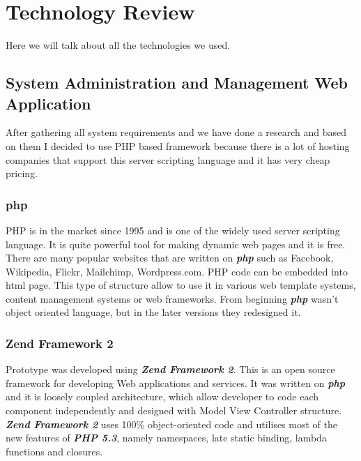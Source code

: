 \chapter{Technology Review} %
Here we will talk about all the technologies we used.

  \section{System Administration and Management Web Application}	%
  After gathering all system requirements and we have done a research and based on them I decided to use PHP based framework because there is a lot of hosting companies that support this server scripting language and it has very cheap pricing.
  

    \subsection{php}
	PHP is in the market since 1995 and is one of the widely used server scripting language. It is quite powerful tool for making dynamic web pages and it is free. There are many popular websites that are written on \textbf{\textit{php}} such as Facebook, Wikipedia, Flickr, Mailchimp, Wordpress.com. PHP code can be embedded into html page. This type of structure allow to use it in various web template systems, content management systems or web frameworks. From beginning \textbf{\textit{php}} wasn't object oriented language, but in the later versions they redesigned it.

    \subsection{Zend Framework 2}
		Prototype was developed using \textbf{\textit{Zend Framework 2}}. This is an open source framework for developing Web applications and services. It was written on \textbf{\textit{php}} and it is loosely coupled architecture, which allow developer to code each component independently and designed with Model View Controller structure. \textbf{\textit{Zend Framework 2}} uses 100\% object-oriented code and utilises most of the new features of \textbf{\textit{PHP 5.3}}, namely namespaces, late static binding, lambda functions and closures.~\cite{ZendFramework-Website-About}
		
